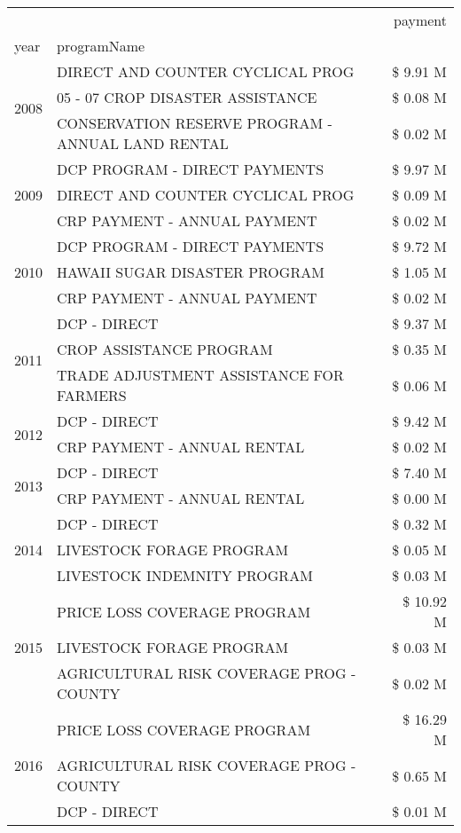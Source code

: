 \begin{tabular}{llr}
\toprule
 &  & payment \\
year & programName &  \\
\midrule
\multirow[t]{3}{*}{2008} & DIRECT AND COUNTER CYCLICAL PROG & \$ 9.91 M \\
 & 05 - 07 CROP DISASTER ASSISTANCE & \$ 0.08 M \\
 & CONSERVATION RESERVE PROGRAM - ANNUAL LAND RENTAL & \$ 0.02 M \\
\cline{1-3}
\multirow[t]{3}{*}{2009} & DCP PROGRAM - DIRECT PAYMENTS & \$ 9.97 M \\
 & DIRECT AND COUNTER CYCLICAL PROG & \$ 0.09 M \\
 & CRP PAYMENT - ANNUAL PAYMENT & \$ 0.02 M \\
\cline{1-3}
\multirow[t]{3}{*}{2010} & DCP PROGRAM - DIRECT PAYMENTS & \$ 9.72 M \\
 & HAWAII SUGAR DISASTER PROGRAM & \$ 1.05 M \\
 & CRP PAYMENT - ANNUAL PAYMENT & \$ 0.02 M \\
\cline{1-3}
\multirow[t]{3}{*}{2011} & DCP - DIRECT & \$ 9.37 M \\
 & CROP ASSISTANCE PROGRAM & \$ 0.35 M \\
 & TRADE ADJUSTMENT ASSISTANCE FOR FARMERS & \$ 0.06 M \\
\cline{1-3}
\multirow[t]{2}{*}{2012} & DCP - DIRECT & \$ 9.42 M \\
 & CRP PAYMENT - ANNUAL RENTAL & \$ 0.02 M \\
\cline{1-3}
\multirow[t]{2}{*}{2013} & DCP - DIRECT & \$ 7.40 M \\
 & CRP PAYMENT - ANNUAL RENTAL & \$ 0.00 M \\
\cline{1-3}
\multirow[t]{3}{*}{2014} & DCP - DIRECT & \$ 0.32 M \\
 & LIVESTOCK FORAGE PROGRAM & \$ 0.05 M \\
 & LIVESTOCK INDEMNITY PROGRAM & \$ 0.03 M \\
\cline{1-3}
\multirow[t]{3}{*}{2015} & PRICE LOSS COVERAGE PROGRAM & \$ 10.92 M \\
 & LIVESTOCK FORAGE PROGRAM & \$ 0.03 M \\
 & AGRICULTURAL RISK COVERAGE PROG - COUNTY & \$ 0.02 M \\
\cline{1-3}
\multirow[t]{3}{*}{2016} & PRICE LOSS COVERAGE PROGRAM & \$ 16.29 M \\
 & AGRICULTURAL RISK COVERAGE PROG - COUNTY & \$ 0.65 M \\
 & DCP - DIRECT & \$ 0.01 M \\

\end{tabular}
